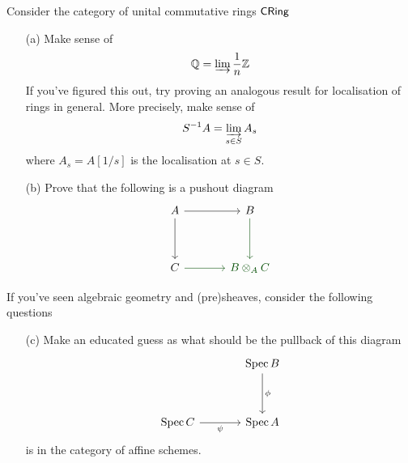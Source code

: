 \begin{problem}\label{prob 6.7}
Consider the category of unital commutative rings $\mathsf{CRing}$
\begin{itemize}
\item[(a)] Make sense of 
\[\mathbb{Q} = \varinjlim \frac{1}{n}\mathbb Z\]
If you've figured this out, try proving an analogous result for localisation of rings in general. More precisely, make sense of
\[S^{-1}A = \underset{s\in S}{\varinjlim}\, A_s\]
where $A_s = A[1/s]$ is the localisation at $s\in S$.
\item[(b)] Prove that the following is a pushout diagram
\[\begin{tikzcd}[row sep=huge, column sep = large]
A\arrow[d] \arrow[r] & B\arrow[d,darkgreen]  \\
C\arrow[r,darkgreen]    & {\color{darkgreen} B \otimes_A C}   
\end{tikzcd}\]
\end{itemize}
If you've seen algebraic geometry and (pre)sheaves, consider the following questions
\begin{itemize}
\item[(c)] Make an educated guess as what should be the pullback of this diagram
\[\begin{tikzcd}[row sep=huge, column sep = large]
& \operatorname{Spec} B \arrow[d, "\phi"] \\
\operatorname{Spec} C \arrow[r, "\psi"']                                              & \operatorname{Spec} A        
\end{tikzcd}\]
is in the category of affine schemes.
\end{itemize}
\end{problem}